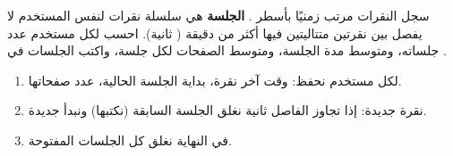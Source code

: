 \begin{statement}
سجل النقرات  مرتب زمنيًا بأسطر . \textbf{الجلسة} هي سلسلة نقرات لنفس المستخدم لا يفصل بين نقرتين متتاليتين فيها أكثر من  دقيقة ( ثانية). احسب لكل مستخدم عدد جلساته، ومتوسط مدة الجلسة، ومتوسط الصفحات لكل جلسة، واكتب الجلسات في .
\end{statement}
\begin{stepsbox}\begin{enumerate}
\item لكل مستخدم نحفظ: وقت آخر نقرة، بداية الجلسة الحالية، عدد صفحاتها.
\item نقرة جديدة: إذا تجاوز الفاصل  ثانية نغلق الجلسة السابقة (نكتبها) ونبدأ جديدة.
\item في النهاية نغلق كل الجلسات المفتوحة.
\end{enumerate}\end{stepsbox}
